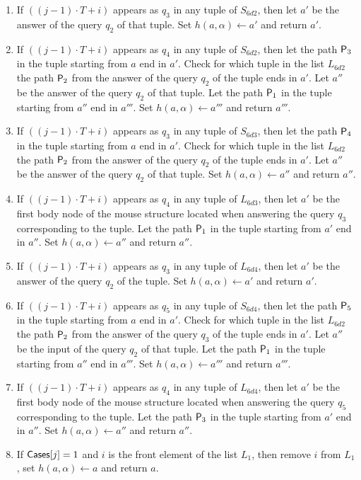 \begin{enumerate}
\begin{enumerate}[label=(\roman*)]
  \item If $((j-1)\cdot T+i)$ appears as $q_3$ in any tuple of $S_{6d2}$, then let $a'$ be the answer of the query $q_2$ of that tuple. Set $h(a,\alpha)\gets a'$ and return $a'$.
  \item If $((j-1)\cdot T+i)$ appears as $q_4$ in any tuple of $S_{6d2}$, then let the path $\mathsf{P}_3$ in the tuple starting from $a$ end in $a'$. Check for which tuple in the list $L_{6d2}$ the path $\mathsf{P}_2$ from the answer of the query $q_2$ of the tuple ends in $a'$. Let $a''$ be the answer of the query $q_2$ of that tuple. Let the path $\mathsf{P}_1$ in the tuple starting from $a''$ end in $a'''$. Set $h(a,\alpha)\gets a'''$ and return $a'''$.
  \item If $((j-1)\cdot T+i)$ appears as $q_3$ in any tuple of $S_{6d3}$, then let the path $\mathsf{P}_4$ in the tuple starting from $a$ end in $a'$. Check for which tuple in the list $L_{6d2}$ the path $\mathsf{P}_2$ from the answer of the query $q_2$ of the tuple ends in $a'$. Let $a''$ be the answer of the query $q_2$ of that tuple.  Set $h(a,\alpha)\gets a''$ and return $a''$.
  \item If $((j-1)\cdot T+i)$ appears as $q_4$ in any tuple of $L_{6d3}$, then let $a'$ be the first body node of the mouse structure located when answering the query $q_3$ corresponding to the tuple. Let the path $\mathsf{P}_1$ in the tuple starting from $a'$ end in $a''$. Set $h(a,\alpha)\gets a''$ and return $a''$.
  \item If $((j-1)\cdot T+i)$ appears as $q_3$ in any tuple of $L_{6d4}$, then let $a'$ be the answer of the query $q_2$ of the tuple. Set $h(a,\alpha)\gets a'$ and return $a'$.
  \item If $((j-1)\cdot T+i)$ appears as $q_5$ in any tuple of $S_{6d4}$, then let the path $\mathsf{P}_5$ in the tuple starting from $a$ end in $a'$. Check for which tuple in the list $L_{6d2}$ the path $\mathsf{P}_2$ from the answer of the query $q_3$ of the tuple ends in $a'$. Let $a''$ be the input of the query $q_2$ of that tuple. Let the path $\mathsf{P}_1$ in the tuple starting from $a''$ end in $a'''$. Set $h(a,\alpha)\gets a'''$ and return $a'''$.
  \item If $((j-1)\cdot T+i)$ appears as $q_4$ in any tuple of $L_{6d4}$, then let $a'$ be the first body node of the mouse structure located when answering the query $q_5$ corresponding to the tuple. Let the path $\mathsf{P}_3$ in the tuple starting from $a'$ end in $a''$. Set $h(a,\alpha)\gets a''$ and return $a''$.
  \item If $\mathsf{Cases}[j]=1$ and $i$ is the front element of the list $L_1$, then remove $i$ from $L_1$, set $h(a,\alpha)\gets a$ and return $a$.

\end{enumerate}
\end{enumerate}
